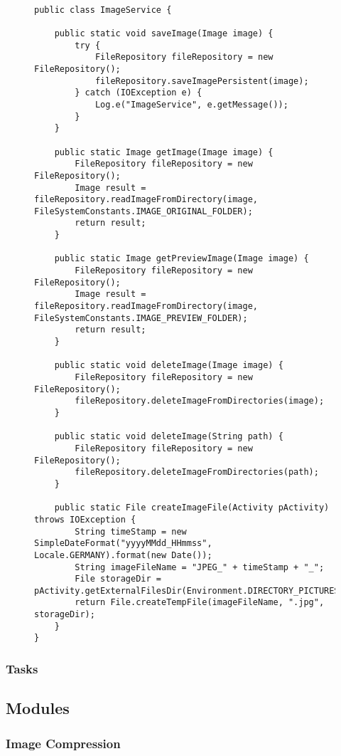 \begin{figure}[H]
\begin{lstlisting}[caption=ImageService (Ruthild Gilles)]

public class ImageService {

    public static void saveImage(Image image) {
        try {
            FileRepository fileRepository = new FileRepository();
            fileRepository.saveImagePersistent(image);
        } catch (IOException e) {
            Log.e("ImageService", e.getMessage());
        }
    }

    public static Image getImage(Image image) {
        FileRepository fileRepository = new FileRepository();
        Image result = fileRepository.readImageFromDirectory(image, FileSystemConstants.IMAGE_ORIGINAL_FOLDER);
        return result;
    }

    public static Image getPreviewImage(Image image) {
        FileRepository fileRepository = new FileRepository();
        Image result = fileRepository.readImageFromDirectory(image, FileSystemConstants.IMAGE_PREVIEW_FOLDER);
        return result;
    }

    public static void deleteImage(Image image) {
        FileRepository fileRepository = new FileRepository();
        fileRepository.deleteImageFromDirectories(image);
    }

    public static void deleteImage(String path) {
        FileRepository fileRepository = new FileRepository();
        fileRepository.deleteImageFromDirectories(path);
    }

    public static File createImageFile(Activity pActivity) throws IOException {
        String timeStamp = new SimpleDateFormat("yyyyMMdd_HHmmss", Locale.GERMANY).format(new Date());
        String imageFileName = "JPEG_" + timeStamp + "_";
        File storageDir = pActivity.getExternalFilesDir(Environment.DIRECTORY_PICTURES);
        return File.createTempFile(imageFileName, ".jpg", storageDir);
    }
}
\end{lstlisting}
\end{figure}

	\subsubsection{Tasks}
\subsection{Modules}
	\subsubsection{Image Compression}
